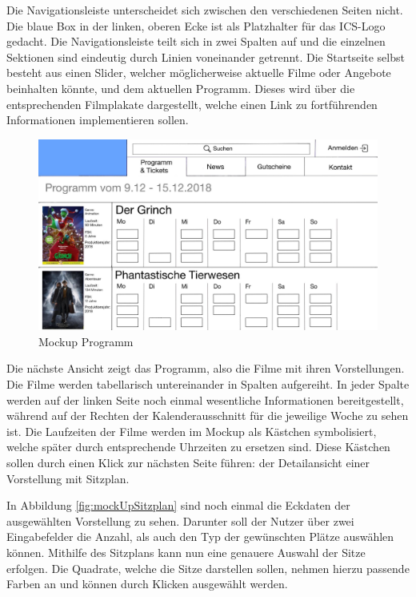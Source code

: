 		Die Navigationsleiste unterscheidet sich zwischen den verschiedenen Seiten nicht. Die blaue Box in der linken, oberen Ecke ist als Platzhalter für das \ac{ICS}-Logo gedacht. Die Navigationsleiste teilt sich in zwei Spalten auf und die einzelnen Sektionen sind eindeutig durch Linien voneinander getrennt. Die Startseite selbst besteht aus einen Slider, welcher möglicherweise aktuelle Filme oder Angebote beinhalten könnte, und dem aktuellen Programm. Dieses wird über die entsprechenden Filmplakate dargestellt, welche einen Link zu fortführenden Informationen implementieren sollen.
		
		\begin{figure}[H]
			\centering 
			\includegraphics[width=12cm]{img/mockUp2.png}
			\captionsetup{format=hang}
			\caption[Mockup Programm]{\label{fig:mockUpProgramm} Mockup Programm }
		\end{figure}
		
		Die nächste Ansicht zeigt das Programm, also die Filme mit ihren Vorstellungen. Die Filme werden tabellarisch untereinander in Spalten aufgereiht. In jeder Spalte werden auf der linken Seite noch einmal wesentliche Informationen bereitgestellt, während auf der Rechten der Kalenderausschnitt für die jeweilige Woche zu sehen ist. Die Laufzeiten der Filme werden im Mockup als Kästchen symbolisiert, welche später durch entsprechende Uhrzeiten zu ersetzen sind. Diese Kästchen sollen durch einen Klick zur nächsten Seite führen: der Detailansicht einer Vorstellung mit Sitzplan.
		
		In Abbildung \ref{fig:mockUpSitzplan} sind noch einmal die Eckdaten der ausgewählten Vorstellung zu sehen. Darunter soll der Nutzer über zwei Eingabefelder die Anzahl, als auch den Typ der gewünschten Plätze auswählen können. Mithilfe des Sitzplans kann nun eine genauere Auswahl der Sitze erfolgen. Die Quadrate, welche die Sitze darstellen sollen, nehmen hierzu passende Farben an und können durch Klicken ausgewählt werden.
		
